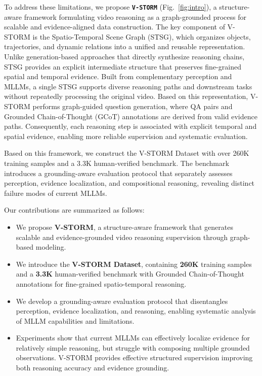 \documentclass[letterpaper]{article} %
\begin{document}
To address these limitations, we propose \textbf{\texttt{V-STORM}} (Fig.~\ref{fig:intro}), a structure-aware framework formulating video reasoning as a graph-grounded process for scalable and evidence-aligned data construction.
The key component of V-STORM is the Spatio-Temporal Scene Graph (STSG), which organizes objects, trajectories, and dynamic relations into a unified and reusable representation. 
Unlike generation-based approaches that directly synthesize reasoning chains, STSG provides an explicit intermediate structure that preserves fine-grained spatial and temporal evidence. 
Built from complementary perception and MLLMs, a single STSG supports diverse reasoning paths and downstream tasks without repeatedly processing the original video. 
Based on this representation, V-STORM performs graph-guided question generation, where QA pairs and Grounded Chain-of-Thought (GCoT) annotations are derived from valid evidence paths. 
Consequently, each reasoning step is associated with explicit temporal and spatial evidence, enabling more reliable supervision and systematic evaluation.

Based on this framework, we construct the V-STORM Dataset with over 260K training samples and a 3.3K human-verified benchmark. The benchmark introduces a grounding-aware evaluation protocol that separately assesses perception, evidence localization, and compositional reasoning, revealing distinct failure modes of current MLLMs.

Our contributions are summarized as follows:
\begin{itemize}
    \item We propose \textbf{V-STORM}, a structure-aware framework that generates scalable and evidence-grounded video reasoning supervision through graph-based modeling.
    
    \item We introduce the \textbf{V-STORM Dataset}, containing \textbf{260K} training samples and a \textbf{3.3K} human-verified benchmark with Grounded Chain-of-Thought annotations for fine-grained spatio-temporal reasoning.
    
    \item We develop a grounding-aware evaluation protocol that disentangles perception, evidence localization, and reasoning, enabling systematic analysis of MLLM capabilities and limitations.
    
    \item Experiments show that current MLLMs can effectively localize evidence for relatively simple reasoning, but struggle with composing multiple grounded observations. V-STORM provides effective structured supervision improving both reasoning accuracy and evidence grounding.
\end{itemize}
\end{document}
